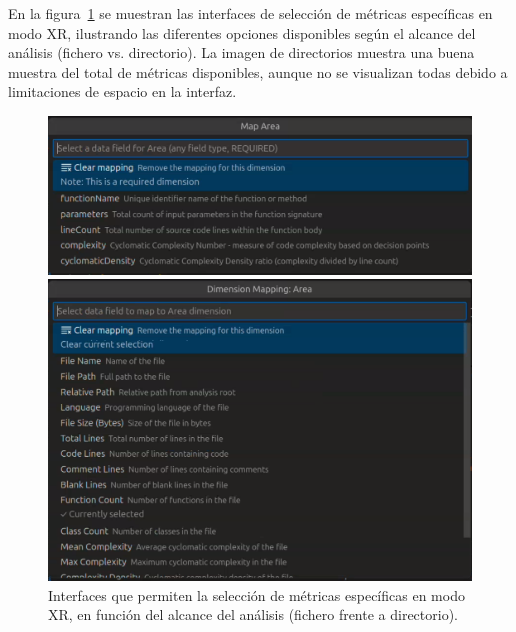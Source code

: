\documentclass[a4paper, 12pt]{book}
\begin{document}
En la figura~\ref{fig:metricas-xr-disponibles} se muestran las interfaces de selección de métricas específicas en modo XR, ilustrando las diferentes opciones disponibles según el alcance del análisis (fichero vs. directorio). La imagen de directorios muestra una buena muestra del total de métricas disponibles, aunque no se visualizan todas debido a limitaciones de espacio en la interfaz.

\begin{figure}[H]
\centering
\begin{minipage}[b]{0.48\textwidth}
\centering
\includegraphics[width=\textwidth]{img/metricas-xr-ficheros.png}
\end{minipage}
\hfill
\begin{minipage}[b]{0.48\textwidth}
\centering
\includegraphics[width=\textwidth]{img/metricas-xr-directorios.png}
\end{minipage}
\caption{Interfaces que permiten la selección de métricas específicas en modo XR, en función del alcance del análisis (fichero frente a directorio).}
\label{fig:metricas-xr-disponibles}
\end{figure}
\end{document}
